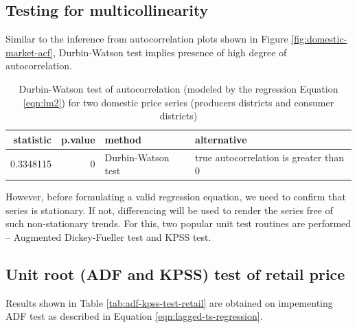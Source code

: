 \documentclass[12pt,]{article}
\begin{document}
\hypertarget{testing-for-multicollinearity}{%
\subsection{Testing for multicollinearity}\label{testing-for-multicollinearity}}

Similar to the inference from autocorrelation plots shown in Figure \ref{fig:domestic-market-acf}, Durbin-Watson test implies presence of high degree of autocorrelation.

\begin{table}

\caption{\label{tab:dwtest-lm2}Durbin-Watson test of autocorrelation (modeled by the regression Equation \ref{eqn:lm2}) for two domestic price series (producers districts and consumer districts)}
\centering
\begin{tabular}[t]{rrll}
\toprule
statistic & p.value & method & alternative\\
\midrule
0.3348115 & 0 & Durbin-Watson test & true autocorrelation is greater than 0\\
\bottomrule
\end{tabular}
\end{table}

However, before formulating a valid regression equation, we need to confirm that series is stationary. If not, differencing will be used to render the series free of such non-stationary trends. For this, two popular unit test routines are performed -- Augmented Dickey-Fueller test and KPSS test.

\hypertarget{unit-root-adf-and-kpss-test-of-retail-price}{%
\subsection{Unit root (ADF and KPSS) test of retail price}\label{unit-root-adf-and-kpss-test-of-retail-price}}

Results shown in Table \ref{tab:adf-kpss-test-retail} are obtained on impementing ADF test as described in Equation \ref{eqn:lagged-ts-regression}.
\end{document}
